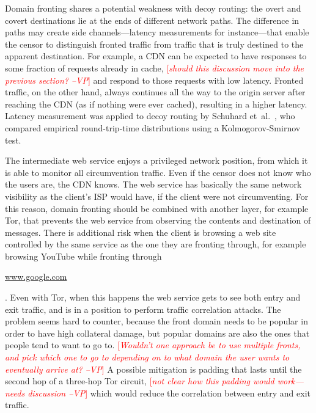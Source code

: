 \documentclass{sig-alternate}
\def\urll#1{\begin{NoHyper}\url{#1}\end{NoHyper}}
\newcommand{\note}[1]{{\textcolor{red}{[\textit{#1}]}}}
\newcommand{\vp}[1]{\note{#1 --VP}}
\begin{document}


Domain fronting shares a potential weakness with decoy routing:
the overt and covert destinations lie at the ends of different
network paths.
The difference in paths may create side channels---latency measurements for instance---that
enable the censor to
distinguish fronted traffic from traffic that is truly destined
to the apparent destination.
For example, a CDN can be expected to have responses
to some fraction of requests already in cache,
\vp{should this discussion move into the previous section?}
and respond to those requests with low latency.
Fronted traffic, on the other hand, always continues all the way
to the origin server after reaching the CDN (as if nothing were ever cached),
resulting in a higher latency.
Latency measurement was applied to decoy routing by Schuhard et~al.~\cite[\S 5]{ccs2012-decoys},
who compared empirical round-trip-time distributions using a
Kolmogorov-Smirnov test.

The intermediate web service enjoys a privileged network position,
from which it is able to monitor all circumvention traffic.
Even if the censor does not know who the users are, the CDN knows.
The web service has basically the same network visibility
as the client's ISP would have, if the client were not circumventing.
For this reason, domain fronting should be combined with another
layer, for example Tor, that prevents the web service from
observing the contents and destination of messages.
There is additional risk when the client is browsing a web site
controlled by the same service as the one they are fronting through,
for example browsing YouTube while fronting through \urll{www.google.com}.
Even with Tor, when this happens the web service gets to see
both entry and exit traffic, and is in a position to
perform traffic correlation attacks.
The problem seems hard to counter, because the front domain needs
to be popular in order to have high collateral damage,
but popular domains are also the ones that people tend to want to go to.
\vp{Wouldn't one approach be to use multiple fronts, and pick which one
to go to depending on to what domain the user wants to eventually arrive at?}
A possible mitigation is padding that lasts until
the second hop of a three-hop Tor circuit,
\vp{not clear how this padding would work---needs discussion}
which would reduce the correlation between entry and exit traffic.
\end{document}
